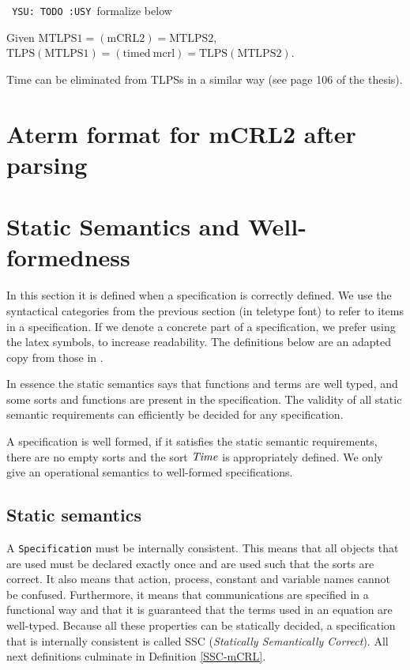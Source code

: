 \documentclass[fleqn,a4paper,dvips]{article}
\def\YSU{\texttt{ YSU: TODO :USY\marginpar{!!!} }}
\begin{document}
\YSU formalize below

\begin{thm}
  Given 
  $\mathrm{MTLPS1}=(\mathrm{mCRL2})=\mathrm{MTLPS2}$,\\
  $\mathrm{TLPS(MTLPS1)}=(\mathrm{timed\ mcrl})=\mathrm{TLPS(MTLPS2)}$.
\end{thm}

Time can be eliminated from TLPSs in a similar way (see page 106 of
the thesis).

\appendix
\newpage
\section{Aterm format for mCRL2 after parsing}

\section{Static Semantics and Well-formedness}
\label{section:SSC} 
In this section it is defined when a specification is correctly defined.
We use the syntactical categories from the previous section (in teletype
font) to refer to items in a specification. If we denote a
concrete part of a specification, we prefer using the latex symbols, to
increase readability. The definitions below are an adapted copy from those in
\cite{GroPo94a}.

In
essence the static semantics says that functions and terms are well
typed, and some sorts and functions are present in the specification. The
validity of all static semantic requirements can efficiently be decided for any
specification.

A specification is well formed, if it satisfies the static semantic requirements,
there are no empty sorts and the sort $\mathit{Time}$ is appropriately defined. We
only give an operational semantics to well-formed specifications.

\subsection{Static semantics}
A {\tt Specification} must be internally consistent. This means
that all objects that are used must be declared exactly once and 
are used such that the sorts are correct. It also means that action,
process, constant and variable names cannot be confused.
Furthermore, it means that communications are specified in a functional
way and that it is guaranteed that the terms used in an equation are well-typed.
Because all these properties can be statically decided, a
specification that is internally consistent is called SSC
({\em Statically Semantically Correct}). All next definitions
culminate in Definition \ref{SSC-mCRL}.
\end{document}
